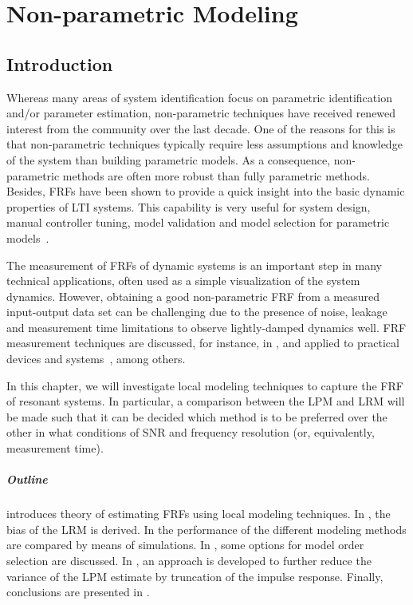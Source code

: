 \chapter{Non-parametric Modeling}
\def\thisDir{ch03-lrm}
\label{sec:nonparametric}
\glsresetall

\section{Introduction}
\label{sec:nonparametric:introduction}

Whereas many areas of system identification focus on parametric identification and/or parameter estimation, non-parametric techniques have received renewed interest from the community over the last decade.
One of the reasons for this is that non-parametric techniques typically require less assumptions and knowledge of the system than building parametric models.
As a consequence, non-parametric methods are often more robust than fully parametric methods.
Besides, \glspl{FRF} have been shown to provide a quick insight into the basic dynamic properties of \gls{LTI} systems.
This capability is very useful for system design, manual controller tuning, model validation and model selection for parametric models~\citep{Pintelon2012}.

The measurement of \glspl{FRF} of dynamic systems is an important step in many technical applications, often used as a simple visualization of the system dynamics.
However, obtaining a good non-parametric \gls{FRF} from a measured input-output data set can be challenging due to the presence of noise, leakage and measurement time limitations to observe lightly-damped dynamics well.
\gls{FRF} measurement techniques are discussed, for instance, in
\citep{Schoukens1998,Schoukens2006LPM,Guillaume1996,Broersen1995,Pintelon2010LPM1,Antoni2007FRF,Pintelon2012}, and applied to practical devices and systems~\citep{Lim2010,Robinson1990,Behjat2010}, among others.

In this chapter, we will investigate local modeling techniques to capture the \gls{FRF} of resonant systems.
In particular, a comparison between the \gls{LPM} and \gls{LRM} will be made such that it can be decided which method is to be preferred over the other in what conditions of \gls{SNR} and frequency resolution (or, equivalently, measurement time).

\paragraph*{Outline}
 introduces theory of estimating \glspl{FRF} using local modeling techniques.
In , the bias of the \gls{LRM} is derived.
In  the performance of the different modeling methods are compared by means of simulations.
In , some options for model order selection are discussed.
In , an approach is developed to further reduce the variance of the \gls{LPM} estimate by truncation of the impulse response.
Finally, conclusions are presented in .

